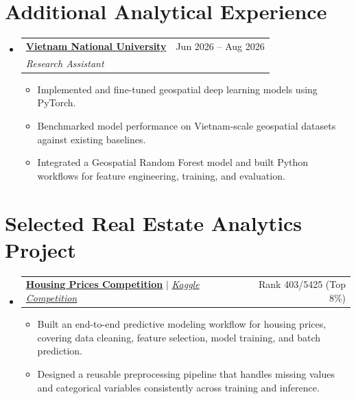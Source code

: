 \documentclass[a4paper,11pt]{article}
\makeatletter
\newcommand{\resumeItem}[1]{
  \item\small{
    {#1\par\vspace{-2pt}}
  }
}
\newcommand{\resumeSubheading}[4]{
  \vspace{-2pt}\item
    \begin{tabular*}{0.97\textwidth}[t]{l@{\extracolsep{\fill}}r}
      \textbf{#1} & #2 \\
      \textit{\small#3} & \textit{\small #4} \\
    \end{tabular*}\vspace{-7pt}
}
\newcommand{\resumeProjectHeading}[2]{
  \item
    \begin{tabular*}{0.97\textwidth}{l@{\extracolsep{\fill}}r}
      \small#1 & #2 \\
    \end{tabular*}\vspace{-7pt}
}
\newcommand{\resumeSubHeadingListStart}{\begin{itemize}[leftmargin=0.15in, label={}]}
\newcommand{\resumeSubHeadingListEnd}{\end{itemize}}
\newcommand{\resumeItemListStart}{\begin{itemize}}
\newcommand{\resumeItemListEnd}{\end{itemize}\vspace{-5pt}}
\makeatother
\begin{document}
\section{Additional Analytical Experience}
\resumeSubHeadingListStart
  \resumeSubheading
    {\href{https://en.vnu.edu.vn/}{Vietnam National University}}{Jun 2026 -- Aug 2026}
    {Research Assistant}{}
    \resumeItemListStart
      \resumeItem{Implemented and fine-tuned geospatial deep learning models using PyTorch.}
      \resumeItem{Benchmarked model performance on Vietnam-scale geospatial datasets against existing baselines.}
      \resumeItem{Integrated a Geospatial Random Forest model and built Python workflows for feature engineering, training, and evaluation.}
    \resumeItemListEnd
\resumeSubHeadingListEnd

\section{Selected Real Estate Analytics Project}
\resumeSubHeadingListStart
  \resumeProjectHeading
    {\textbf{\href{https://github.com/lhnminh/Kaggle-Housing-Prices-Comp}{Housing Prices Competition}} $|$ \emph{\href{https://www.kaggle.com/competitions/home-data-for-ml-course/overview}{Kaggle Competition}}}{Rank 403/5425 (Top 8\%)}
    \resumeItemListStart
      \resumeItem{Built an end-to-end predictive modeling workflow for housing prices, covering data cleaning, feature selection, model training, and batch prediction.}
      \resumeItem{Designed a reusable preprocessing pipeline that handles missing values and categorical variables consistently across training and inference.}
    \resumeItemListEnd
\resumeSubHeadingListEnd
\end{document}
